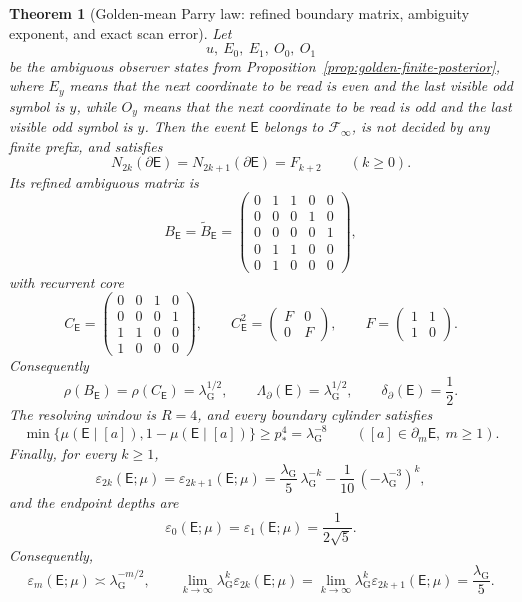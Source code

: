 \documentclass{etds}%
\numberwithin{equation}{section}
\theoremstyle{plain}
\newtheorem{theorem}{Theorem}[section]
\theoremstyle{definition}
\theoremstyle{remark}
\begin{document}
\begin{theorem}[Golden-mean Parry law: refined boundary matrix, ambiguity exponent, and exact scan error]
\label{ex:golden-mean-specialization}
Let
\[
u,\ E_0,\ E_1,\ O_0,\ O_1
\]
be the ambiguous observer states from
Proposition~\ref{prop:golden-finite-posterior}, where $E_y$ means that the
next coordinate to be read is even and the last visible odd symbol is $y$,
while $O_y$ means that the next coordinate to be read is odd and the last
visible odd symbol is $y$.  Then the event $\mathsf{E}$ belongs to
$\mathcal{F}_\infty$, is not decided by any finite prefix, and satisfies
\[
N_{2k}(\partial\mathsf{E})=N_{2k+1}(\partial\mathsf{E})=F_{k+2}
\qquad(k\ge 0).
\]
Its refined ambiguous matrix is
\[
B_{\mathsf{E}}=\widetilde{B}_{\mathsf{E}}
=\begin{pmatrix}
0&1&1&0&0\\
0&0&0&1&0\\
0&0&0&0&1\\
0&1&1&0&0\\
0&1&0&0&0
\end{pmatrix},
\]
with recurrent core
\[
C_{\mathsf{E}}
=\begin{pmatrix}
0&0&1&0\\
0&0&0&1\\
1&1&0&0\\
1&0&0&0
\end{pmatrix},
\qquad
C_{\mathsf{E}}^2
=\begin{pmatrix}
F&0\\
0&F
\end{pmatrix},
\qquad
F=\begin{pmatrix}1&1\\ 1&0\end{pmatrix}.
\]
Consequently
\[
\rho(B_{\mathsf{E}})=\rho(C_{\mathsf{E}})=\lambda_{\mathrm G}^{1/2},
\qquad
\Lambda_\partial(\mathsf{E})=\lambda_{\mathrm G}^{1/2},
\qquad
\delta_\partial(\mathsf{E})=\frac12.
\]
The resolving window is $R=4$, and every boundary cylinder satisfies
\[
\min\{\mu(\mathsf{E}\mid[a]),1-\mu(\mathsf{E}\mid[a])\}
\ge p_*^4=\lambda_{\mathrm G}^{-8}
\qquad([a]\in\partial_m\mathsf{E},\ m\ge 1).
\]
Finally, for every $k\ge 1$,
\[
\varepsilon_{2k}(\mathsf{E};\mu)
=\varepsilon_{2k+1}(\mathsf{E};\mu)
=\frac{\lambda_{\mathrm G}}{5}\,\lambda_{\mathrm G}^{-k}
-\frac{1}{10}\,(-\lambda_{\mathrm G}^{-3})^k,
\]
and the endpoint depths are
\[
\varepsilon_0(\mathsf{E};\mu)=\varepsilon_1(\mathsf{E};\mu)
=\frac1{2\sqrt5}.
\]
Consequently,
\[
\varepsilon_m(\mathsf{E};\mu)\asymp \lambda_{\mathrm G}^{-m/2},
\qquad
\lim_{k\to\infty}\lambda_{\mathrm G}^k\varepsilon_{2k}(\mathsf{E};\mu)
=\lim_{k\to\infty}\lambda_{\mathrm G}^k\varepsilon_{2k+1}(\mathsf{E};\mu)
=\frac{\lambda_{\mathrm G}}{5}.
\]
\end{theorem}
\end{document}
